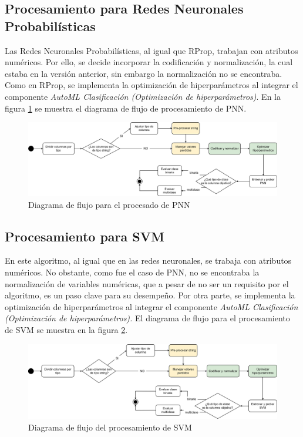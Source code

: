 \subsection{Procesamiento para Redes Neuronales Probabilísticas}
Las Redes Neuronales Probabilísticas, al igual que RProp, trabajan con atributos numéricos. Por ello, se decide incorporar la codificación y normalización, la cual estaba en la versión anterior, sin embargo la normalización no se encontraba. Como en RProp, se implementa la optimización de hiperparámetros al integrar el componente \textit{AutoML Clasificación (Optimización de hiperparámetros)}. En la figura \ref{fig:procesado-pnn} se muestra el diagrama de flujo de procesamiento de PNN.

\begin{figure}[H]
	\centering
	\includegraphics[width=1\linewidth]{"figuras/capi 2/modelos/procesado pnn.drawio"}
	\caption{Diagrama de flujo para el procesado de PNN}
	\label{fig:procesado-pnn}
\end{figure}


\subsection{Procesamiento para SVM}
En este algoritmo, al igual que en las redes neuronales, se trabaja con atributos numéricos. No obstante, como fue el caso de PNN, no se encontraba la normalización de variables numéricas, que a pesar de no ser un requisito por el algoritmo, es un paso clave para su desempeño. Por otra parte, se implementa la optimización de hiperparámetros al integrar el componente \textit{AutoML Clasificación (Optimización de hiperparámetros).} El diagrama de flujo para el procesamiento de SVM se muestra en la figura \ref{fig:procesado-svm}.

\begin{figure}[H]
	\centering
	\includegraphics[width=1\linewidth]{"figuras/capi 2/modelos/procesado svm.drawio"}
	\caption{Diagrama de flujo del procesamiento de SVM}
	\label{fig:procesado-svm}
\end{figure}


